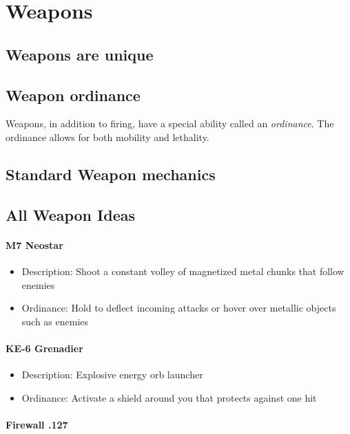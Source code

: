 \documentclass[../Main.tex]{subfiles}
\begin{document}
\section{Weapons}


\subsection{Weapons are unique}


\subsection{Weapon ordinance}

Weapons, in addition to firing, have a special ability called an \emph{ordinance}. The ordinance allows for both mobility and lethality.

\subsection{Standard Weapon mechanics}


\subsection{All Weapon Ideas}

\paragraph{M7 Neostar}

\begin{itemize}
	\item Description: Shoot a constant volley of magnetized metal chunks that follow enemies
	\item Ordinance: Hold to deflect incoming attacks or hover over metallic objects such as enemies
\end{itemize} 


\paragraph{KE-6 Grenadier}
 
\begin{itemize}
	\item Description: Explosive energy orb launcher
	\item Ordinance: Activate a shield around you that protects against one hit
\end{itemize} 

\paragraph{Firewall .127}
\end{document}
